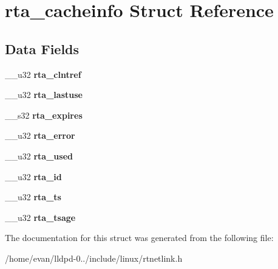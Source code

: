 \section{rta\-\_\-cacheinfo \-Struct \-Reference}
\label{structrta__cacheinfo}
\subsection*{\-Data \-Fields}
\begin{DoxyCompactItemize}
\item 
\-\_\-\-\_\-u32 {\bfseries rta\-\_\-clntref}\label{structrta__cacheinfo_ae22ce1d20f0ee3f3bac111f9d7917ba9}

\item 
\-\_\-\-\_\-u32 {\bfseries rta\-\_\-lastuse}\label{structrta__cacheinfo_a4b92b4195fcc30d7e4f28e3c9087433f}

\item 
\-\_\-\-\_\-s32 {\bfseries rta\-\_\-expires}\label{structrta__cacheinfo_aff72915e45e65fd4b0c59bebb31236e2}

\item 
\-\_\-\-\_\-u32 {\bfseries rta\-\_\-error}\label{structrta__cacheinfo_a3b9e3974c47724bcdc87041897a29c18}

\item 
\-\_\-\-\_\-u32 {\bfseries rta\-\_\-used}\label{structrta__cacheinfo_adbdc607617018a233b3dfa77a400db27}

\item 
\-\_\-\-\_\-u32 {\bfseries rta\-\_\-id}\label{structrta__cacheinfo_aca2d19430390bb23f5e77b6dcaa1bfd2}

\item 
\-\_\-\-\_\-u32 {\bfseries rta\-\_\-ts}\label{structrta__cacheinfo_a9f7787890dc940b74c77616d7e5cc03f}

\item 
\-\_\-\-\_\-u32 {\bfseries rta\-\_\-tsage}\label{structrta__cacheinfo_a96308bebe2d7dc19010c0be64ab18191}

\end{DoxyCompactItemize}


\-The documentation for this struct was generated from the following file\-:\begin{DoxyCompactItemize}
\item 
/home/evan/lldpd-\/0../include/linux/rtnetlink.\-h\end{DoxyCompactItemize}
